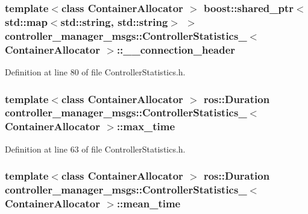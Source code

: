 \subsubsection[{\-\_\-\-\_\-connection\-\_\-header}]{\setlength{\rightskip}{0pt plus 5cm}template$<$class Container\-Allocator $>$ boost\-::shared\-\_\-ptr$<$std\-::map$<$std\-::string, std\-::string$>$ $>$ {\bf controller\-\_\-manager\-\_\-msgs\-::\-Controller\-Statistics\-\_\-}$<$ \-Container\-Allocator $>$\-::{\bf \-\_\-\-\_\-connection\-\_\-header}}\label{structcontroller__manager__msgs_1_1ControllerStatistics___a82551eb7c7cccbf85493daa85b0fc338}


\-Definition at line 80 of file \-Controller\-Statistics.\-h.

\subsubsection[{max\-\_\-time}]{\setlength{\rightskip}{0pt plus 5cm}template$<$class Container\-Allocator $>$ ros\-::\-Duration {\bf controller\-\_\-manager\-\_\-msgs\-::\-Controller\-Statistics\-\_\-}$<$ \-Container\-Allocator $>$\-::{\bf max\-\_\-time}}\label{structcontroller__manager__msgs_1_1ControllerStatistics___a892ab5b6c8a70dca71726e7f5ee45f9e}


\-Definition at line 63 of file \-Controller\-Statistics.\-h.

\subsubsection[{mean\-\_\-time}]{\setlength{\rightskip}{0pt plus 5cm}template$<$class Container\-Allocator $>$ ros\-::\-Duration {\bf controller\-\_\-manager\-\_\-msgs\-::\-Controller\-Statistics\-\_\-}$<$ \-Container\-Allocator $>$\-::{\bf mean\-\_\-time}}\label{structcontroller__manager__msgs_1_1ControllerStatistics___a4161ec53e068bc7679b0bbb04d7fe3ee}


